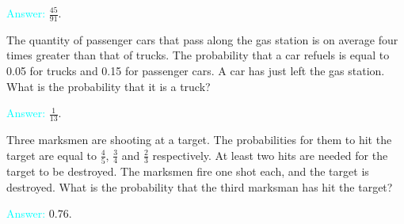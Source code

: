 \documentclass[14pt]{exam}
\begin{document}
\begin{questions}
		\textcolor{cyan}{Answer:} $\frac{45}{91}$.
		
		\question
		The quantity of passenger cars that pass along the gas station is on average four times greater than that of trucks. The probability that a car refuels is equal to 0.05 for trucks and 0.15 for passenger cars. A car has just left the gas station. What is the probability that it is a truck?
		
		\textcolor{cyan}{Answer:} $\frac{1}{13}$.
		
		
		
		\question
		Three marksmen are shooting at a target. The probabilities for them to hit the target are equal to $\frac{4}{5}$, $\frac{3}{4}$ and $\frac{2}{3}$ respectively. At least two hits are needed for the target to be destroyed. The marksmen fire one shot each, and the target is destroyed. What is the probability that the third marksman has hit the target?
		
		\textcolor{cyan}{Answer:} $0.76$.
		
		
		
		
		

\end{questions}
\end{document}
